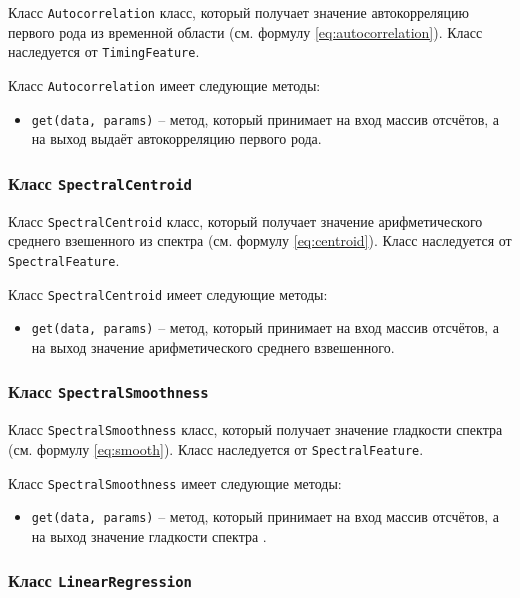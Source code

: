 Класс \texttt{Autocorrelation} класс, который получает значение автокорреляцию первого рода из временной области (см. формулу \ref{eq:autocorrelation}). Класс наследуется от \texttt{TimingFeature}.

Класс \texttt{Autocorrelation} имеет следующие методы:

\begin{itemize}
\item{\texttt{get(data, params)} --  метод, который принимает на вход массив отсчётов, а на выход выдаёт автокорреляцию первого рода. }
\end{itemize}

\subsubsection{Класс \texttt{SpectralCentroid}}

Класс \texttt{SpectralCentroid} класс, который получает значение арифметического среднего взешенного из спектра (см. формулу \ref{eq:centroid}). Класс наследуется от \texttt{SpectralFeature}.

Класс \texttt{SpectralCentroid} имеет следующие методы:

\begin{itemize}
\item{\texttt{get(data, params)} --  метод, который принимает на вход массив отсчётов, а на выход  значение арифметического среднего взвешенного. }
\end{itemize}

\subsubsection{Класс \texttt{SpectralSmoothness}}

Класс \texttt{SpectralSmoothness} класс, который получает значение гладкости спектра (см. формулу \ref{eq:smooth}). Класс наследуется от \texttt{SpectralFeature}.

Класс \texttt{SpectralSmoothness} имеет следующие методы:

\begin{itemize}
\item{\texttt{get(data, params)} --  метод, который принимает на вход массив отсчётов, а на выход значение гладкости спектра . }
\end{itemize}

\subsubsection{Класс \texttt{LinearRegression}}

